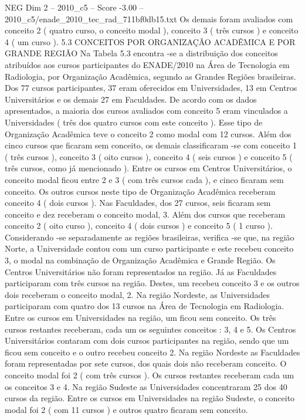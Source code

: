 \begin{textsample}{NEG Dim 2 – 2010\_c5 – Score -3.00 – 2010\_c5/enade\_2010\_tec\_rad\_711bf0db15.txt}
Os demais foram avaliados com conceito 2 ( quatro curso, o conceito modal ), conceito 3 ( três cursos ) e conceito 4 ( um curso ). 5.3 CONCEITOS POR ORGANIZAÇÃO ACADÊMICA E POR GRANDE REGIÃO Na Tabela 5.3 encontra -se a distribuição dos conceitos atribuídos aos cursos participantes do ENADE/2010 na Área de Tecnologia em Radiologia, por Organização Acadêmica, segundo as Grandes Regiões brasileiras.
Dos 77 cursos participantes, 37 eram oferecidos em Universidades, 13 em Centros Universitários e os demais 27 em Faculdades.
De acordo com os dados apresentados, a maioria dos cursos avaliados com conceito 5 eram vinculados a Universidades ( três dos quatro cursos com este conceito ).
Esse tipo de Organização Acadêmica teve o conceito 2 como modal com 12 cursos.
Além dos cinco cursos que ficaram sem conceito, os demais classificaram -se com conceito 1 ( três cursos ), conceito 3 ( oito cursos ), conceito 4 ( seis cursos ) e conceito 5 ( três cursos, como já mencionado ).
Entre os cursos em Centros Universitários, o conceito modal ficou entre 2 e 3 ( com três cursos cada ), e cinco ficaram sem conceito.
Os outros cursos neste tipo de Organização Acadêmica receberam conceito 4 ( dois cursos ).
Nas Faculdades, dos 27 cursos, seis ficaram sem conceito e dez receberam o conceito modal, 3.
Além dos cursos que receberam conceito 2 ( oito curso ), conceito 4 ( dois cursos ) e conceito 5 ( 1 curso ).
Considerando -se separadamente as regiões brasileiras, verifica -se que, na região Norte, a Universidade contou com um curso participante e este recebeu conceito 3, o modal na combinação de Organização Acadêmica e Grande Região.
Os Centros Universitários não foram representados na região.
Já as Faculdades participaram com três cursos na região.
Destes, um recebeu conceito 3 e os outros dois receberam o conceito modal, 2.
Na região Nordeste, as Universidades participaram com quatro dos 13 cursos na Área de Tecnologia em Radiologia.
Entre os cursos em Universidades na região, um ficou sem conceito.
Os três cursos restantes receberam, cada um os seguintes conceitos : 3, 4 e 5.
Os Centros Universitários contaram com dois cursos participantes na região, sendo que um ficou sem conceito e o outro recebeu conceito 2.
Na região Nordeste as Faculdades foram representadas por sete cursos, dos quais dois não receberam conceito.
O conceito modal foi 2 ( com três cursos ).
Os cursos restantes receberam cada um os conceitos 3 e 4.
Na região Sudeste as Universidades concentraram 25 dos 40 cursos da região.
Entre os cursos em Universidades na região Sudeste, o conceito modal foi 2 ( com 11 cursos ) e outros quatro ficaram sem conceito.

\end{textsample}
